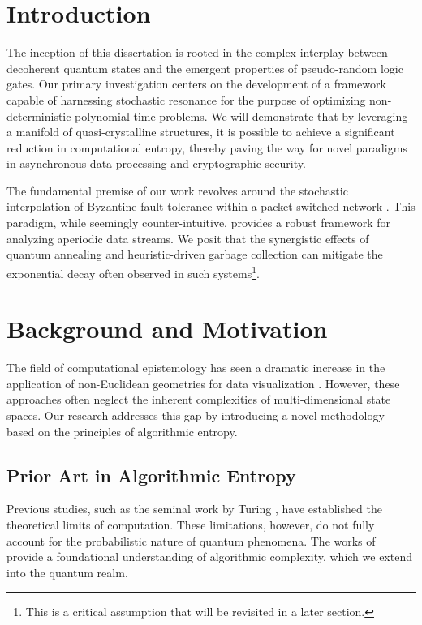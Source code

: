 \section{Introduction}
The inception of this dissertation is rooted in the complex interplay between decoherent quantum states and the emergent properties of pseudo-random logic gates. Our primary investigation centers on the development of a framework capable of harnessing stochastic resonance for the purpose of optimizing non-deterministic polynomial-time problems. We will demonstrate that by leveraging a manifold of quasi-crystalline structures, it is possible to achieve a significant reduction in computational entropy, thereby paving the way for novel paradigms in asynchronous data processing and cryptographic security.

The fundamental premise of our work revolves around the stochastic interpolation of Byzantine fault tolerance within a packet-switched network \cite{knuth1997art}. This paradigm, while seemingly counter-intuitive, provides a robust framework for analyzing aperiodic data streams. We posit that the synergistic effects of quantum annealing and heuristic-driven garbage collection can mitigate the exponential decay often observed in such systems\footnote{This is a critical assumption that will be revisited in a later section.}.

\section{Background and Motivation}
The field of computational epistemology has seen a dramatic increase in the application of non-Euclidean geometries for data visualization \cite{shannon1948mathematical}. However, these approaches often neglect the inherent complexities of multi-dimensional state spaces. Our research addresses this gap by introducing a novel methodology based on the principles of algorithmic entropy.

\subsection{Prior Art in Algorithmic Entropy}
Previous studies, such as the seminal work by Turing \cite{turing1950computing}, have established the theoretical limits of computation. These limitations, however, do not fully account for the probabilistic nature of quantum phenomena. The works of \cite{cormen2009introduction} provide a foundational understanding of algorithmic complexity, which we extend into the quantum realm.

